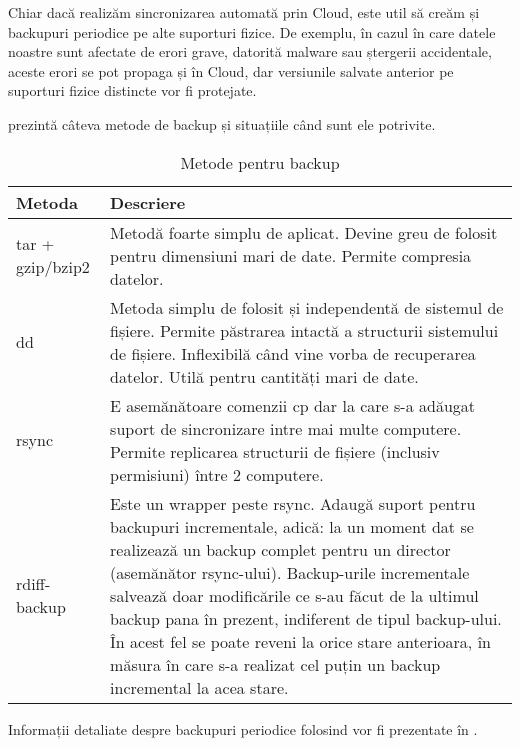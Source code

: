 Chiar dacă realizăm sincronizarea automată prin Cloud, este util să creăm și backupuri periodice pe alte suporturi fizice.
De exemplu, în cazul în care datele noastre sunt afectate de erori grave, datorită malware sau ștergerii accidentale, aceste erori se pot propaga și în Cloud, dar versiunile salvate anterior pe suporturi fizice distincte vor fi protejate.

 prezintă câteva metode de backup și situațiile când sunt ele
potrivite.

\begin{table}[htb]
  \begin{center}
    \begin{tabular}{ p{} p{} }
      \toprule
        \textbf{Metoda} &
        \textbf{Descriere} \\
      \midrule
        tar + gzip/bzip2 &
        Metodă foarte simplu de aplicat.
        Devine greu de folosit pentru dimensiuni mari de date.
        Permite compresia datelor. \\
      \midrule
        dd &
        Metoda simplu de folosit și independentă de sistemul de fișiere.
        Permite păstrarea intactă a structurii sistemului de fișiere.
        Inflexibilă când vine vorba de recuperarea datelor.
        Utilă pentru cantități mari de date. \\
      \midrule
        rsync &
        E asemănătoare comenzii cp dar la care s-a adăugat suport de sincronizare intre mai multe computere.
        Permite replicarea structurii de fișiere (inclusiv permisiuni) între 2 computere. \\
      \midrule
        rdiff-backup &
        Este un wrapper peste rsync.
        Adaugă suport pentru backupuri incrementale, adică: la un moment dat se realizează un backup complet pentru un director (asemănător rsync-ului).
        Backup-urile incrementale salvează doar modificările ce s-au făcut de la ultimul backup pana în prezent, indiferent de tipul backup-ului.
        În acest fel se poate reveni la orice stare anterioara, în măsura în care s-a realizat cel puțin un backup incremental la acea stare. \\
      \bottomrule
    \end{tabular}
  \end{center}
  \caption{Metode pentru backup}
  \label{table:file-system-backup-cmd}
\end{table}

Informații detaliate despre backupuri periodice folosind  vor fi prezentate în .

